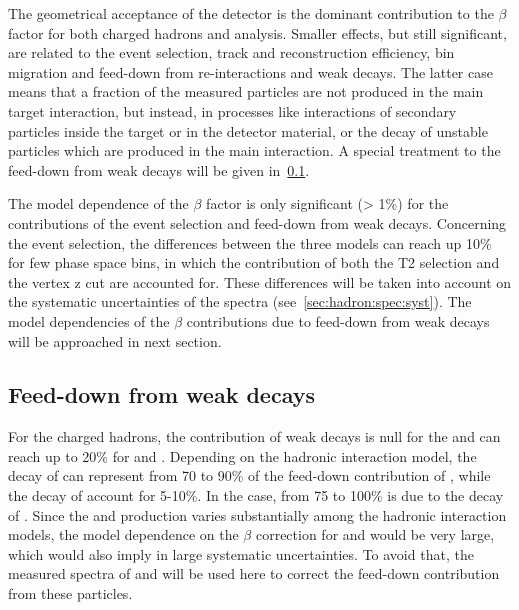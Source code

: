 The geometrical acceptance of the detector
is the dominant contribution to the $\beta$ factor
for both charged hadrons and \vzero analysis.
Smaller effects, but still significant, are related
to the event selection, track and \vzero reconstruction efficiency, 
bin migration and feed-down from re-interactions and weak decays.
The latter case means that a fraction of the measured particles
are not produced in the main target interaction, but instead,
in processes like interactions of secondary particles inside
the target or in the detector material, or the decay of unstable
particles which are produced in the main interaction.
A special treatment to the feed-down from weak decays
will be given in~\cref{sec:hadron:correction:fd}. 

The model dependence of the $\beta$ factor is only significant (> 1\%) for the
contributions of the event selection and feed-down from weak decays.
Concerning the event selection, the differences between the three models
can reach up 10\% for few phase space bins, in which the contribution
of both the T2 selection and the vertex z cut are accounted for.
These differences will be taken into account on the systematic uncertainties
of the spectra (see~\cref{sec:hadron:spec:syst}).
The model dependencies of the $\beta$ contributions due to feed-down
from weak decays will be approached in next section.


\subsection{\boldmath Feed-down from weak decays}
\label{sec:hadron:correction:fd}

For the charged hadrons, the contribution of weak decays
is null for the \kaons and can reach up to 20\% for \pions and
\protonpm. Depending on the hadronic interaction model,
the decay of \kzeros can represent from 70 to 90\% of the
feed-down contribution of \pions, while the decay of \lambs account
for 5-10\%. In the \protonpm case, from 75 to 100\% is due to the decay
of \lambs.
Since the \lambs and \kzeros production varies substantially 
among the hadronic interaction models, the model dependence
on the $\beta$ correction for \pions and \protonpm would
be very large, which would also imply in large
systematic uncertainties. To avoid that, the
measured spectra of \lambs and \kzeros will be used here
to correct the feed-down contribution from these particles.

